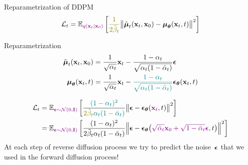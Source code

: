 \begin{frame}{Reparametrization of DDPM}
	\vspace{-0.3cm}
	\[
		\cL_t = \bbE_{\color{violet}q(\bx_t | \bx_0)} \left[ {\color{olive}\frac{1}{2\tilde{\beta}_t}} \bigl\| \tilde{\bmu}_t(\bx_t, \bx_0) - \bmu_{\btheta}(\bx_t, t) \bigr\|^2  \right]
	\]
	\vspace{-0.3cm}
	\begin{block}{Reparametrization}
		\vspace{-0.7cm}
		\begin{align*}
			\tilde{\boldsymbol{\mu}}_t(\mathbf{x}_t, \mathbf{x}_0) &= \frac{1}{\sqrt{\alpha_t}} \mathbf{x}_t - \frac{1 - \alpha_t}{\sqrt{\alpha_t (1 - \bar{\alpha}_t)}} \boldsymbol{\epsilon} \\
			\boldsymbol{\mu}_{\boldsymbol{\theta}}(\mathbf{x}_t, t) &= \frac{1}{\sqrt{\alpha_t}} \mathbf{x}_t - {\color{teal}\frac{1 - \alpha_t}{\sqrt{\alpha_t (1 - \bar{\alpha}_t)}}} \boldsymbol{\epsilon}_{\boldsymbol{\theta}}(\mathbf{x}_t, t)
		\end{align*}
		\vspace{-0.7cm}
	\end{block}
		\vspace{-0.5cm}
		\begin{align*}
			\cL_t &=  \bbE_{\color{violet} \bepsilon \sim \cN(0, \bI)} \left[ \frac{{\color{teal}(1 - \alpha_t)^2}}{{\color{olive}2\tilde{\beta}_t} {\color{teal} \alpha_t (1 - \bar{\alpha}_t)}} \bigl\| \bepsilon - \bepsilon_{\btheta}({\color{violet}\bx_t}, t) \bigr\|^2 \right] \\
			& =	 \bbE_{\color{violet}\bepsilon \sim \cN(0, \bI)} \left[ \frac{(1 - \alpha_t)^2}{2\tilde{\beta}_t \alpha_t (1 - \bar{\alpha}_t)} \Bigl\| \bepsilon - \bepsilon_{\btheta}\bigl( {\color{violet}\sqrt{\bar{\alpha}_t} \bx_0 + \sqrt{1 - \bar{\alpha}_t} \bepsilon}, t\bigr) \Bigr\|^2 \right]
		\end{align*}
		At each step of reverse diffusion process we try to predict the noise~$\boldsymbol{\epsilon}$ that we used in the forward diffusion process!
	\end{frame}
